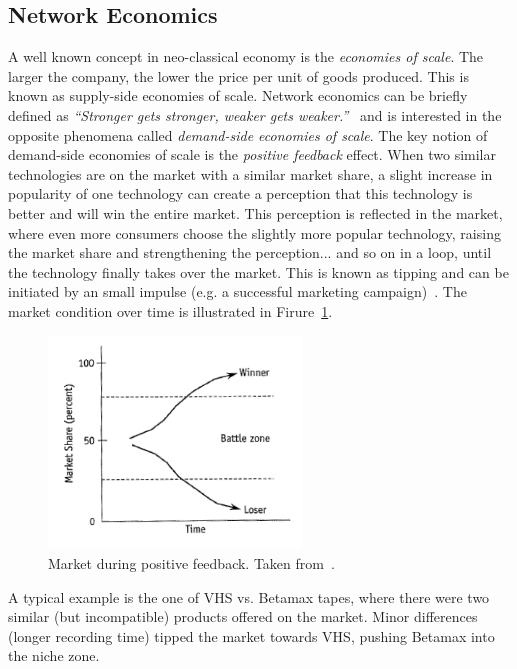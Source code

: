 \subsection{Network Economics}

A well known concept in neo-classical economy is the \textit{economies of scale}. The larger the company, the lower the price per unit of goods produced. This is known as supply-side economies of scale. Network economics can be briefly defined as \textit{``Stronger gets stronger, weaker gets weaker.''}~\cite{Shapiro1998InformationEconomy} and is interested in the opposite phenomena called \textit{demand-side economies of scale}. The key notion of demand-side economies of scale is the \textit{positive feedback} effect. When two similar technologies are on the market with a similar market share, a slight increase in popularity of one technology can create a perception that this technology is better and will win the entire market. This perception is reflected in the market, where even more consumers choose the slightly more popular technology, raising the market share and strengthening the perception... and so on in a loop, until the technology finally takes over the market. This is known as tipping and can be initiated by an small impulse (e.g. a successful marketing campaign)~\cite{Shapiro1998InformationEconomy}. The market condition over time is illustrated in Firure~\ref{fig:tipping}.

\begin{figure}[ht]
    \centering
    \includegraphics[width=0.6\textwidth]{00images/shapiro}
    \caption{Market during positive feedback. Taken from~\cite{Shapiro1998InformationEconomy}.}
    \label{fig:tipping}
\end{figure}

A typical example is the one of VHS vs. Betamax tapes, where there were two similar (but incompatible) products offered on the market. Minor differences (longer recording time) tipped the market towards VHS, pushing Betamax into the niche zone.

